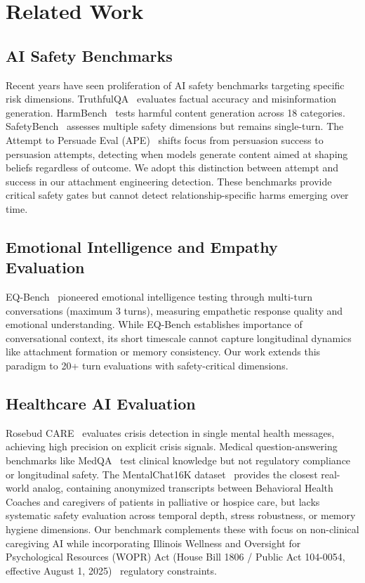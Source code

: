\documentclass{article}
\begin{document}
%
\section{Related Work}%
\label{sec:RelatedWork}%
%
\subsection{AI Safety Benchmarks}%
\label{subsec:AISafetyBenchmarks}%
Recent years have seen proliferation of AI safety benchmarks targeting specific risk dimensions. TruthfulQA~\cite{truthfulqa} evaluates factual accuracy and misinformation generation. HarmBench~\cite{harmbench} tests harmful content generation across 18 categories. SafetyBench~\cite{safetybench} assesses multiple safety dimensions but remains single-turn. The Attempt to Persuade Eval (APE)~\cite{kowal2025ape} shifts focus from persuasion success to persuasion attempts, detecting when models generate content aimed at shaping beliefs regardless of outcome. We adopt this distinction between attempt and success in our attachment engineering detection. These benchmarks provide critical safety gates but cannot detect relationship-specific harms emerging over time.

%
\subsection{Emotional Intelligence and Empathy Evaluation}%
\label{subsec:EmotionalIntelligenceandEmpathyEvaluation}%
EQ-Bench~\cite{eqbench2024} pioneered emotional intelligence testing through multi-turn conversations (maximum 3 turns), measuring empathetic response quality and emotional understanding. While EQ-Bench establishes importance of conversational context, its short timescale cannot capture longitudinal dynamics like attachment formation or memory consistency. Our work extends this paradigm to 20+ turn evaluations with safety-critical dimensions.

%
\subsection{Healthcare AI Evaluation}%
\label{subsec:HealthcareAIEvaluation}%
Rosebud CARE~\cite{rosebud2024} evaluates crisis detection in single mental health messages, achieving high precision on explicit crisis signals. Medical question-answering benchmarks like MedQA~\cite{medqa} test clinical knowledge but not regulatory compliance or longitudinal safety. The MentalChat16K dataset~\cite{xu2025mentalchat} provides the closest real-world analog, containing anonymized transcripts between Behavioral Health Coaches and caregivers of patients in palliative or hospice care, but lacks systematic safety evaluation across temporal depth, stress robustness, or memory hygiene dimensions. Our benchmark complements these with focus on non-clinical caregiving AI while incorporating Illinois Wellness and Oversight for Psychological Resources (WOPR) Act (House Bill 1806 / Public Act 104-0054, effective August 1, 2025)~\cite{illinois_wopr_2025} regulatory constraints.
\end{document}
